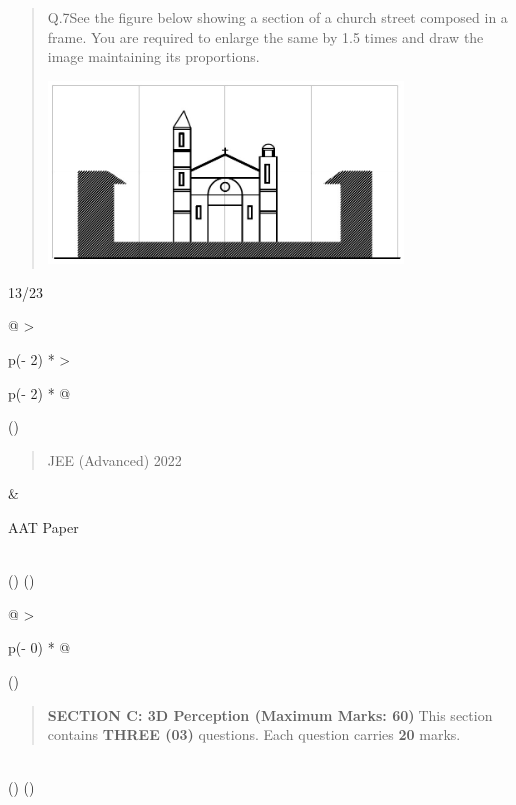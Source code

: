 \documentclass[
]{article}
\begin{document}
\begin{quote}
Q.7See the figure below showing a section of a church street composed in
a frame. You are required to enlarge the same by 1.5 times and draw the
image maintaining its proportions.

\includegraphics[width=3.70833in,height=1.91111in]{vertopal_2361032064654423b71b7db67d98c753/media/image14.png}
\end{quote}

13/23

\begin{longtable}[]{@{}
  >{\raggedright\arraybackslash}p{(\columnwidth - 2\tabcolsep) * }
  >{\raggedright\arraybackslash}p{(\columnwidth - 2\tabcolsep) * }@{}}
\toprule()
\begin{minipage}[b]{\linewidth}\raggedright
\begin{quote}
JEE (Advanced) 2022
\end{quote}
\end{minipage} & \begin{minipage}[b]{\linewidth}\raggedright
AAT Paper
\end{minipage} \\
\midrule()
\endhead
\bottomrule()
\end{longtable}

\begin{longtable}[]{@{}
  >{\raggedright\arraybackslash}p{(\columnwidth - 0\tabcolsep) * }@{}}
\toprule()
\begin{minipage}[b]{\linewidth}\raggedright
\begin{quote}
\textbf{SECTION C: 3D Perception (Maximum Marks: 60)}This section
contains \textbf{THREE (03)} questions. Each question carries
\textbf{20} marks.
\end{quote}
\end{minipage} \\
\midrule()
\endhead
\bottomrule()
\end{longtable}
\end{document}
